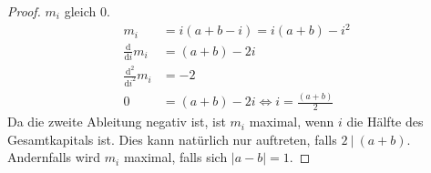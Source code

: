 \documentclass[a4paper]{scrartcl}
\newcommand{\gdw}{\Leftrightarrow}
\def \blattnr {3}
\begin{document}
\begin{enumerate}[label=\bfseries \blattnr.\arabic*]
\begin{enumerate}
\begin{proof}
                   $m_i$ gleich $0$.
                   \begin{align*}
                       m_i &= i(a+b-i) = i(a+b) - i^2 \\
                       \frac{\mathrm{d}}{\mathrm{d} i} m_i &= (a+b) -2i \\
                       \frac{\mathrm{d}^2}{\mathrm{d} i^2} m_i &= -2 \\
                       0 &= (a+b) -2i \gdw i = \frac{(a+b)}{2}
                   \end{align*}
                   Da die zweite Ableitung negativ ist, ist $m_i$ maximal, wenn
                   $i$ die Hälfte des Gesamtkapitals ist. Dies kann natürlich
                   nur auftreten, falls $2\ |\ (a+b)$. Andernfalls wird $m_i$
                   maximal, falls sich $|a-b|=1$.
               \end{proof}

       \end{enumerate}
   


\end{enumerate}
\end{document}
